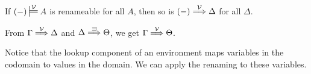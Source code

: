 \begin{lemma}\label{thm:env-ren}
  If $\plr{-} \sdtstile{}\V A$ is renameable for all $A$, then so is
  $\plr{-} \env\V \Delta$ for all $\Delta$.
\end{lemma}
\begin{lemma}\label{thm:env-postren}
  From $\Gamma \stackrel{\mathcal V}\Longrightarrow \Delta$ and $\Delta \env{\sqni} \Theta$, we get
  $\Gamma \stackrel{\mathcal V}\Longrightarrow \Theta$.
\end{lemma}
\begin{proofsketch}
  Notice that the lookup component of an environment maps variables in the
  codomain to values in the domain.
  We can apply the renaming to these variables.
\end{proofsketch}
